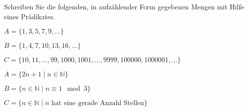 Schreiben Sie die folgenden, in aufzählender Form gegebenen Mengen mit
Hilfe eines Prädikates.
\begin{teilaufgaben}
\item
$A=\{1,3,5,7,9,\dots\}$
\item
$B=\{1,4,7,10,13,16,\dots\}$
\item
$C=\{10,11,\dots,99,1000,1001,\dots,9999,100000,1000001,\dots\}$
\end{teilaufgaben}

\begin{loesung}
\begin{teilaufgaben}
\item
$A=\{2n+1\mid n\in\mathbb{N}\}$
\item
$B=\{ n\in\mathbb{N}\mid n\equiv 1\mod 3\}$
\item
$C=\{n\in\mathbb{N}\mid \text{$n$ hat eine gerade Anzahl Stellen}\}$
\qedhere
\end{teilaufgaben}
\end{loesung}
